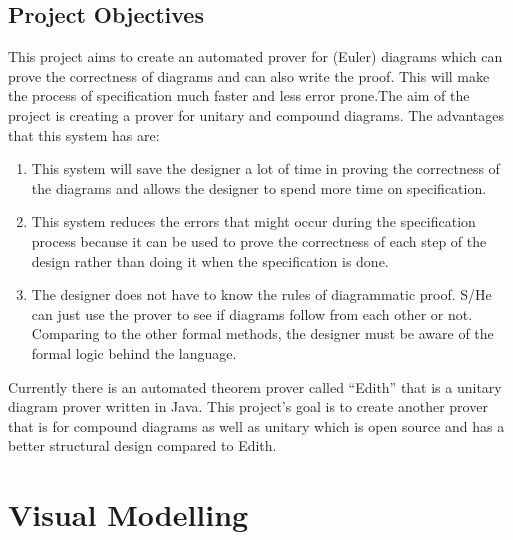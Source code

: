 \documentclass[a4paper]{article}
\begin{document}
\subsection{Project Objectives}

This project aims to create an automated  prover for (Euler) diagrams which can prove the correctness of diagrams and can also write the proof. This will make the process of specification much faster and less error prone.The aim of the project is creating a prover for unitary and compound diagrams. 
The advantages that this system has are:

\begin{enumerate}
\item This system will save the designer a lot of time in proving the correctness of the diagrams and allows the designer to spend more time on specification.
\item This system reduces the errors that might occur during the specification process because it can be used to prove the correctness of each step of the design rather than doing it when the specification is done.
\item The designer does not have to know the rules of diagrammatic proof. S/He can just use the prover to see if diagrams follow from each other or not. Comparing to the other formal methods, the designer must be aware of the formal logic behind the language.
\end{enumerate}
Currently there is an automated theorem prover called “Edith” that is a unitary diagram prover written in Java. This project's goal is to create another prover that is for compound diagrams as well as unitary which is open source and has a better structural design compared to Edith. 

\newpage

\section{Visual Modelling}
\end{document}
